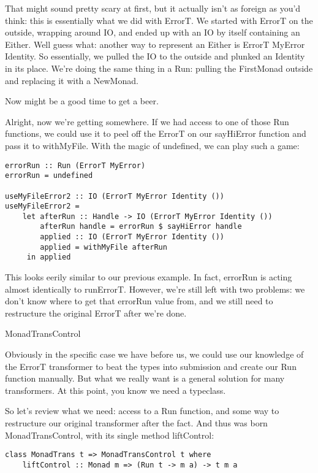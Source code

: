 That might sound pretty scary at first, but it actually isn't as foreign as you'd think: this is essentially what we did with ErrorT. We started with ErrorT on the outside, wrapping around IO, and ended up with an IO by itself containing an Either. Well guess what: another way to represent an Either is ErrorT MyError Identity. So essentially, we pulled the IO to the outside and plunked an Identity in its place. We're doing the same thing in a Run: pulling the FirstMonad outside and replacing it with a NewMonad.

Now might be a good time to get a beer.

Alright, now we're getting somewhere. If we had access to one of those Run functions, we could use it to peel off the ErrorT on our sayHiError function and pass it to withMyFile. With the magic of undefined, we can play such a game:

\begin{lstlisting}
errorRun :: Run (ErrorT MyError)
errorRun = undefined

useMyFileError2 :: IO (ErrorT MyError Identity ())
useMyFileError2 =
    let afterRun :: Handle -> IO (ErrorT MyError Identity ())
        afterRun handle = errorRun $ sayHiError handle
        applied :: IO (ErrorT MyError Identity ())
        applied = withMyFile afterRun
     in applied
\end{lstlisting}

This looks eerily similar to our previous example. In fact, errorRun is acting almost identically to runErrorT. However, we're still left with two problems: we don't know where to get that errorRun value from, and we still need to restructure the original ErrorT after we're done.

MonadTransControl

Obviously in the specific case we have before us, we could use our knowledge of the ErrorT transformer to beat the types into submission and create our Run function manually. But what we really want is a general solution for many transformers. At this point, you know we need a typeclass.

So let's review what we need: access to a Run function, and some way to restructure our original transformer after the fact. And thus was born MonadTransControl, with its single method liftControl:

\begin{lstlisting}
class MonadTrans t => MonadTransControl t where
    liftControl :: Monad m => (Run t -> m a) -> t m a
\end{lstlisting}

